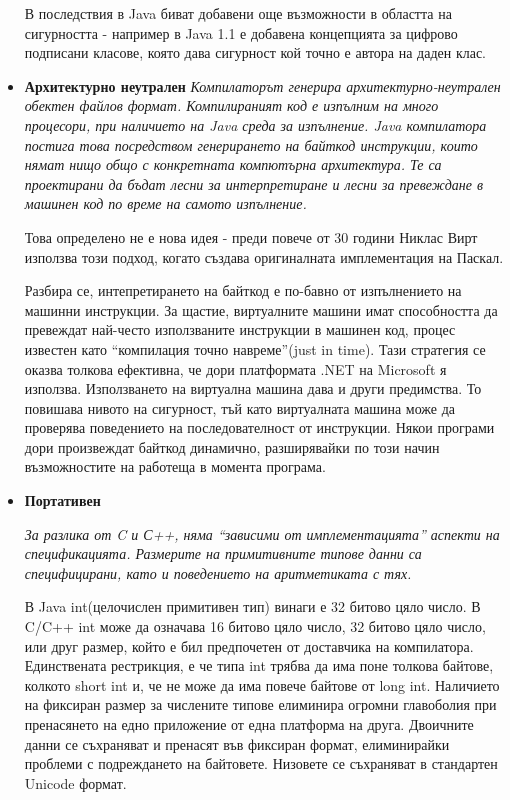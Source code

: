 \begin{itemize}
В последствия в Java биват добавени още възможности в областта на
сигурността - например в Java 1.1 е добавена концепцията за цифрово
подписани класове, която дава сигурност кой точно е автора на даден клас.

  \item \textbf{Архитектурно неутрален}
    \emph{Компилаторът генерира архитектурно-неутрален обектен файлов
    формат. Компилираният код е изпълним на много процесори, при
    наличието на Java среда за изпълнение. Java компилатора постига
    това посредством генерирането на байткод инструкции, които нямат
    нищо общо с конкретната компютърна архитектура. Те са проектирани
    да бъдат лесни за интерпретиране и лесни за превеждане в машинен
    код по време на самото изпълнение.}

    Това определено не е нова идея - преди повече от 30 години Никлас
    Вирт използва този подход, когато създава оригиналната
    имплементация на Паскал. 

    Разбира се, интепретирането на байткод е по-бавно от изпълнението
    на машинни инструкции. За щастие, виртуалните машини имат
    способността да превеждат най-често използваните инструкции в
    машинен код, процес известен като "`компилация точно
    навреме"'(just in time). Тази стратегия се оказва толкова
    ефективна, че дори платформата .NET на Microsoft я
    използва. Използването на виртуална машина дава и други
    предимства. То повишава нивото на сигурност, тъй като виртуалната
    машина може да проверява поведението на последователност от
    инструкции. Някои програми дори произвеждат байткод динамично,
    разширявайки по този начин възможностите на работеща в момента
    програма.

  \item \textbf{Портативен}

    \emph{За разлика от C и С++, няма "`зависими от имплементацията"' аспекти на
      спецификацията. Размерите на примитивните типове данни са
      специфицирани, като и поведението на аритметиката с тях.}

    В Java int(целочислен примитивен тип) винаги е 32 битово цяло
    число. В C/C++ int може да означава 16 битово цяло число, 32
    битово цяло число, или друг размер, който е бил предпочетен от
    доставчика на компилатора. Единствената рестрикция, е че типа int
    трябва да има поне толкова байтове, колкото short int и, че не може
    да има повече байтове от long int. Наличието на фиксиран размер за
    числените типове елиминира огромни главоболия при пренасянето на
    едно приложение от една платформа на друга. Двоичните данни се
    съхраняват и пренасят във фиксиран формат, елиминирайки проблеми с
    подреждането на байтовете. Низовете се съхраняват в стандартен
    Unicode формат.


\end{itemize}
